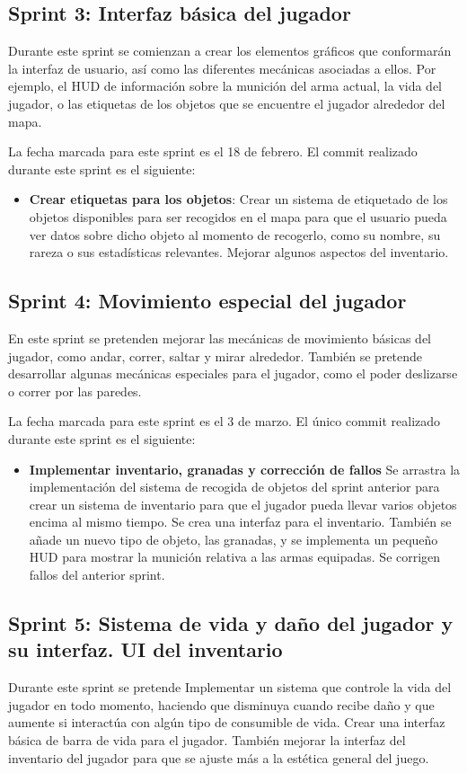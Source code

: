 \subsection{Sprint 3: Interfaz básica del jugador}
Durante este sprint se comienzan a crear los elementos gráficos que conformarán la interfaz de usuario, así como las diferentes mecánicas asociadas a ellos. Por ejemplo, el HUD de información sobre la munición del arma actual, la vida del jugador, o las etiquetas de los objetos que se encuentre el jugador alrededor del mapa.

La fecha marcada para este sprint es el 18 de febrero. El commit realizado durante este sprint es el siguiente:
\begin{itemize}
    \item \textbf{Crear etiquetas para los objetos}: Crear un sistema de etiquetado de los objetos disponibles para ser recogidos en el mapa para que el usuario pueda ver datos sobre dicho objeto al momento de recogerlo, como su nombre, su rareza o sus estadísticas relevantes. Mejorar algunos aspectos del inventario.
\end{itemize}
\subsection{Sprint 4: Movimiento especial del jugador}
En este sprint se pretenden mejorar las mecánicas de movimiento básicas del jugador, como andar, correr, saltar y mirar alrededor. También se pretende desarrollar algunas mecánicas especiales para el jugador, como el poder deslizarse o correr por las paredes.

La fecha marcada para este sprint es el 3 de marzo. El único commit realizado durante este sprint es el siguiente:
\begin{itemize}
    \item \textbf{Implementar inventario, granadas y corrección de fallos} Se arrastra la implementación del sistema de recogida de objetos del sprint anterior para crear un sistema de inventario para que el jugador pueda llevar varios objetos encima al mismo tiempo. Se crea una interfaz para el inventario. También se añade un nuevo tipo de objeto, las granadas, y se implementa un pequeño HUD para mostrar la munición relativa a las armas equipadas. Se corrigen fallos del anterior sprint.
    \end{itemize}
\subsection{Sprint 5: Sistema de vida y daño del jugador y su interfaz. UI del inventario}
Durante este sprint se pretende Implementar un sistema que controle la vida del jugador en todo momento, haciendo que disminuya cuando recibe daño y que aumente si interactúa con algún tipo de consumible de vida. Crear una interfaz básica de barra de vida para el jugador. También mejorar la interfaz del inventario del jugador para que se ajuste más a la estética general del juego.

